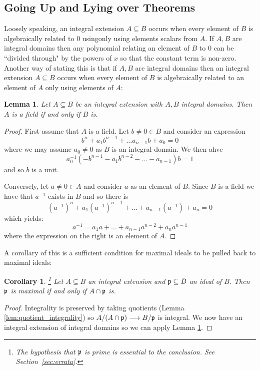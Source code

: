 \documentclass[12pt]{article}
\theoremstyle{plain}
\newtheorem{lemma}[thm]{Lemma}
\newtheorem{cor}[thm]{Corollary}
\theoremstyle{definition}
\newcommand{\lto}{\longrightarrow}
\begin{document}
\subsection{Going Up and Lying over Theorems}
Loosely speaking, an integral extension $A \subseteq B$ occurs when every element of $B$ is algebraically related to $0$ usingonly using elements scalars from $A$. If $A,B$ are integral domains then any polynomial relating an element of $B$ to $0$ can be ``divided through" by the powers of $x$ so that the constant term is non-zero. Another way of stating this is that if $A,B$ are integral domains then an integral extension $A \subseteq B$ occurs when every element of $B$ is algebraically related to an element of $A$ only using elements of $A$:
%
\begin{lemma}
\label{lem:integral_ext_fields}
Let $A \subseteq B$ be an integral extension with $A,B$ integral domains. Then $A$ is a field if and only if $B$ is.
\end{lemma}
\begin{proof}
First assume that $A$ is a field. Let $b \neq 0 \in B$ and consider an expression
\[b^n + a_1b^{n-1} + \hdots a_{n-1}b + a_0 = 0\]
where we may assume $a_0 \neq 0$ as $B$ is an integral domain. We then ahve
\[a_0^{-1}(-b^{n-1} - a_1b^{n-2} - \hdots - a_{n-1})b = 1\]
and so $b$ is a unit.

Conversely, let $a \neq 0\in A$ and consider $a$ as an element of $B$. Since $B$ is a field we have that $a^{-1}$ exists in $B$ and so there is
\[(a^{-1})^n + a_{1}(a^{-1})^{n-1} + \hdots + a_{n-1}(a^{-1}) + a_n = 0\]
which yields:
\[a^{-1} = a_1a + \hdots + a_{n-1}a^{n-2} + a_na^{n-1}\]
where the expression on the right is an element of $A$.
\end{proof}
A corollary of this is a sufficient condition for maximal ideals to be pulled back to maximal ideals:
\begin{cor}
\label{cor:maximality_preserved_integrality}\footnote{The hypothesis that $\frak{p}$ is prime is essential to the conclusion. See Section~\ref{sec:errata}.}
Let $A \subseteq B$ an integral extension and $\frak{p} \subseteq B$ an ideal of $B$. Then $\frak{p}$ is maximal if and only if $A \cap \frak{p}$ is.
\end{cor}
\begin{proof}
Integrality is preserved by taking quotients (Lemma \ref{lem:quotient_integrality}) so $A/(A \cap \frak{p}) \lto B/\frak{p}$ is integral. We now have an integral extension of integral domains so we can apply Lemma \ref{lem:integral_ext_fields}.
\end{proof}
\end{document}

